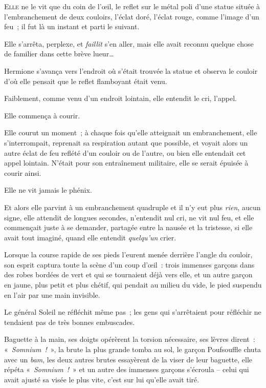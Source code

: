 
\lettrine{E}{lle} ne le vit que du coin de l'œil, le reflet sur le métal poli d'une statue située à l'embranchement de deux couloirs, l'éclat doré, l'éclat rouge, comme l'image d'un feu~; il fut là un instant et parti le suivant.

Elle s'arrêta, perplexe, et \emph{faillit} s'en aller, mais elle avait reconnu quelque chose de familier dans cette brève lueur…

Hermione s'avança vers l'endroit où s'était trouvée la statue et observa le couloir d'où elle pensait que le reflet flamboyant était venu.

Faiblement, comme venu d'un endroit lointain, elle entendit le cri, l'appel.

Elle commença à courir.

Elle courut un moment~; à chaque fois qu'elle atteignait un embranchement, elle s'interrompait, reprenait sa respiration autant que possible, et voyait alors un autre éclat de feu reflété d'un couloir ou de l'autre, ou bien elle entendait cet appel lointain.
N'était pour son entraînement militaire, elle se serait épuisée à courir ainsi.

Elle ne vit jamais le phénix.

Et alors elle parvint à un embranchement quadruple et il n'y eut plus \emph{rien}, aucun signe, elle attendit de longues secondes, n'entendit nul cri, ne vit nul feu, et elle commençait juste à se demander, partagée entre la nausée et la tristesse, si elle avait tout imaginé, quand elle entendit \emph{quelqu'un} crier.

Lorsque la course rapide de ses pieds l'eurent menée derrière l'angle du couloir, son esprit captura toute la scène d'un coup d'œil~: trois immenses garçons dans des robes bordées de vert et qui se tournaient déjà vers elle, et un autre garçon en jaune, plus petit et plus chétif, qui pendait au milieu du vide, le pied suspendu en l'air par une main invisible.

Le général Soleil ne réfléchit même pas~; les gens qui s'arrêtaient pour réfléchir ne tendaient pas de très bonnes embuscades.

Baguette à la main, ses doigts opérèrent la torsion nécessaire, ses lèvres dirent~: «~\emph{Somnium~!}~», la brute la plus grande tomba au sol, le garçon Poufsouffle chuta avec un \emph{bam}, les deux autres brutes essayèrent de la viser de leur baguette, elle répéta «~\emph{Somnium~!}~» et un autre des immenses garçons s'écroula -- celui qui avait ajusté sa visée le plus vite, c'est sur lui qu'elle avait tiré.

